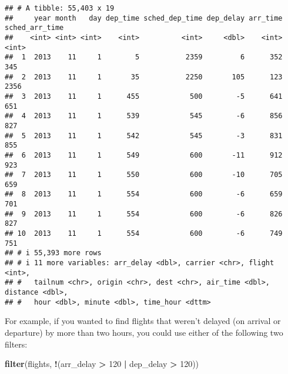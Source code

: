 \documentclass[
]{article}
\newenvironment{Shaded}{\begin{snugshade}}{\end{snugshade}}
\newcommand{\DecValTok}[1]{\textcolor[rgb]{0.00,0.00,0.81}{#1}}
\newcommand{\FunctionTok}[1]{\textcolor[rgb]{0.13,0.29,0.53}{\textbf{#1}}}
\newcommand{\NormalTok}[1]{#1}
\newcommand{\SpecialCharTok}[1]{\textcolor[rgb]{0.81,0.36,0.00}{\textbf{#1}}}
\begin{document}
\begin{verbatim}
## # A tibble: 55,403 x 19
##     year month   day dep_time sched_dep_time dep_delay arr_time sched_arr_time
##    <int> <int> <int>    <int>          <int>     <dbl>    <int>          <int>
##  1  2013    11     1        5           2359         6      352            345
##  2  2013    11     1       35           2250       105      123           2356
##  3  2013    11     1      455            500        -5      641            651
##  4  2013    11     1      539            545        -6      856            827
##  5  2013    11     1      542            545        -3      831            855
##  6  2013    11     1      549            600       -11      912            923
##  7  2013    11     1      550            600       -10      705            659
##  8  2013    11     1      554            600        -6      659            701
##  9  2013    11     1      554            600        -6      826            827
## 10  2013    11     1      554            600        -6      749            751
## # i 55,393 more rows
## # i 11 more variables: arr_delay <dbl>, carrier <chr>, flight <int>,
## #   tailnum <chr>, origin <chr>, dest <chr>, air_time <dbl>, distance <dbl>,
## #   hour <dbl>, minute <dbl>, time_hour <dttm>
\end{verbatim}

For example, if you wanted to find flights that weren't delayed (on
arrival or departure) by more than two hours, you could use either of
the following two filters:

\begin{Shaded}
\begin{Highlighting}[]
\FunctionTok{filter}\NormalTok{(flights, }\SpecialCharTok{!}\NormalTok{(arr\_delay }\SpecialCharTok{\textgreater{}} \DecValTok{120} \SpecialCharTok{|}\NormalTok{ dep\_delay }\SpecialCharTok{\textgreater{}} \DecValTok{120}\NormalTok{))}
\end{Highlighting}
\end{Shaded}
\end{document}
